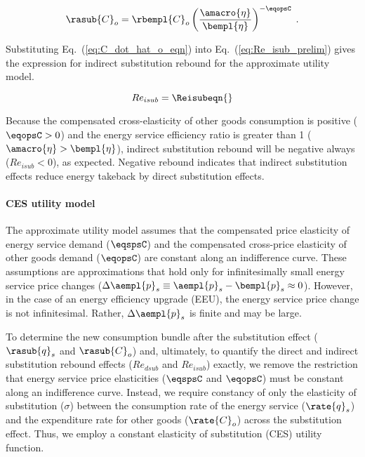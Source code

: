 \begin{equation} \label{eq:C_dot_hat_o_eqn}
  \rasub{C}_o = \rbempl{C}_o \left( \frac{\amacro{\eta}}{\bempl{\eta}} \right)^{-\eqopsC} \; .
\end{equation}

Substituting Eq.~(\ref{eq:C_dot_hat_o_eqn}) into Eq.~(\ref{eq:Re_isub_prelim})
gives the expression for 
indirect substitution rebound for the approximate utility model.

\begin{equation}
  Re_{isub} = \Reisubeqn{}
\end{equation}

Because the compensated cross-elasticity of other goods consumption is positive ($\eqopsC > 0$) and
the energy service efficiency ratio is greater than 1 ($\amacro{\eta} > \bempl{\eta}$),
indirect substitution rebound will be negative always ($Re_{isub} < 0$),
as expected.
Negative rebound indicates that indirect substitution effects 
reduce energy takeback by direct substitution effects.


\paragraph{CES utility model}
\label{sec:Resub_exact_method}

The approximate utility model assumes that 
the compensated price elasticity of energy service demand ($\eqspsC$) and
the compensated cross-price elasticity of other goods demand ($\eqopsC$)
are constant along an indifference curve.
These assumptions are approximations that hold only 
for infinitesimally small energy service price changes 
($\Delta \aempl{p}_s \equiv \aempl{p}_s - \bempl{p}_s \approx 0$).
However, in the case of an energy efficiency upgrade (EEU), 
the energy service price change is not infinitesimal.
Rather, 
$\Delta \aempl{p}_s$ is finite and may be large.

To determine the new consumption bundle after the substitution effect 
($\rasub{q}_s$ and $\rasub{C}_o$)
and,
ultimately, to quantify the direct and indirect substitution rebound effects
($Re_{dsub}$ and $Re_{isub}$) exactly,
we remove the restriction that energy service price elasticities ($\eqspsC$ and $\eqopsC$)
must be constant along an indifference curve.
Instead, we require constancy of only
the elasticity of substitution ($\sigma$) between
the consumption rate of the energy service ($\rate{q}_s$)
and the expenditure rate for other goods ($\rate{C}_o$)
across the substitution effect.
Thus, we employ a constant elasticity of substitution (CES)
utility function.

